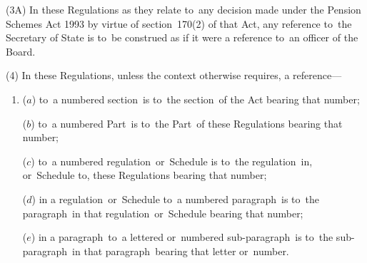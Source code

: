 \documentclass[12pt,a4paper]{article}
\begin{document}
(3A) In these Regulations as they relate to~any decision made under the Pension Schemes Act 1993 by virtue of section~170(2) of that Act, any reference to~the Secretary of State is to~be construed as if it were a reference to~an officer of the Board.

(4) In these Regulations, unless the context otherwise requires, a reference—
\begin{enumerate}\item[]
($a$) to~a numbered section~is to~the section~of the Act bearing that number;

($b$) to~a numbered Part~is to~the Part~of these Regulations bearing that number;

($c$) to~a numbered regulation~or~Schedule is to~the regulation~in, or~Schedule to, these Regulations bearing that number;

($d$) in a regulation~or~Schedule to~a numbered paragraph~is to~the paragraph~in that regulation~or~Schedule bearing that number;

($e$) in a paragraph~to~a lettered or~numbered sub-paragraph~is to~the sub-paragraph~in that paragraph~bearing that letter or~number.
\end{enumerate}
\end{document}
